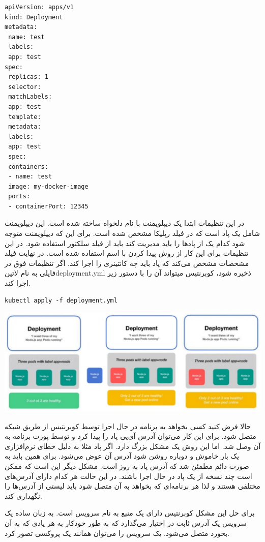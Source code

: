 \documentclass[a4]{report}
\begin{document}
\begin{latin}
\begin{verbatim}
apiVersion: apps/v1
kind: Deployment
metadata:
 name: test
 labels:
 app: test
spec:
 replicas: 1
 selector:
 matchLabels:
 app: test
 template:
 metadata:
 labels:
 app: test
 spec:
 containers:
 - name: test
 image: my-docker-image
 ports:
 - containerPort: 12345
\end{verbatim}
\end{latin}

در این تنظیمات ابتدا یک دیپلویمنت با نام دلخواه ساخته شده است. این دیپلویمنت شامل یک پاد است که در فیلد رپلیکا مشخص شده است. برای این که دیپلویمنت متوجه شود کدام یک از پادها را باید مدیریت کند باید از فیلد سلکتور
استفاده شود. در این تنظیمات برای این کار از روش پیدا کردن با اسم استفاده شده است. در نهایت فیلد مشخصات مشخص می‌کند که پاد باید چه کانتینری را اجرا کند.
اگر تنظیمات فوق در فایلی به نام ‌لاتین{deployment.yml} ذخیره شود، کوبرنتیس میتواند آن را با دستور
زیر اجرا کند.

\begin{latin}
\begin{verbatim}
kubectl apply -f deployment.yml
\end{verbatim}
\end{latin}

\includegraphics[scale=0.5]{fig/deploy}

حالا فرض کنید کسی بخواهد به برنامه در حال اجرا توسط کوبرنتیس از طریق شبکه متصل شود. برای این کار
می‌توان آدرس آی‌پی پاد را پیدا کرد و توسط پورت برنامه به آن وصل شد. اما این روش یک مشکل بزرگ دارد. اگر پاد مثلا به دلیل خطای نرم‌افزاری یک بار خاموش و دوباره روشن شود آدرس آن عوض می‌شود. برای
همین باید به صورت دائم مطمئن شد که آدرس پاد به روز است. مشکل دیگر این است که ممکن است چند
نسخه از یک پاد در حال اجرا باشند. در این حالت هر کدام دارای آدرس‌های مختلفی هستند و لذا هر برنامه‌ای
که بخواهد به آن متصل شود باید لیستی از آدرس‌ها را نگهداری کند.

برای حل این مشکل کوبرنتیس دارای یک منبع به نام سرویس است. به زبان ساده یک سرویس یک آدرس ثابت در اختیار می‌گذارد که به طور خودکار به هر پادی که به آن بخورد متصل می‌شود. یک سرویس را می‌توان همانند یک پروکسی
 تصور کرد.
\end{document}
